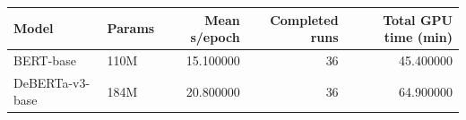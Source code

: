 \begin{tabular}{llrrr}
\toprule
Model & Params & Mean s/epoch & Completed runs & Total GPU time (min) \\
\midrule
BERT-base & 110M & 15.100000 & 36 & 45.400000 \\
DeBERTa-v3-base & 184M & 20.800000 & 36 & 64.900000 \\
\bottomrule
\end{tabular}

